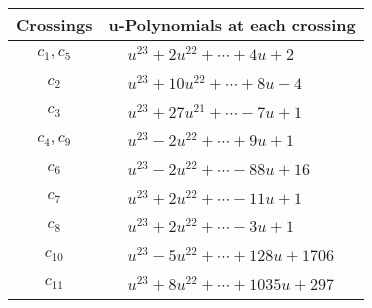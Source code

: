 \documentclass[1p]{elsarticle_modified}
\theoremstyle{definition}
\begin{document}
\begin{tabular}{m{50pt}|m{274pt}}
Crossings & \hspace{64pt}u-Polynomials at each crossing \\
\hline $$\begin{aligned}c_{1},c_{5}\end{aligned}$$&$\begin{aligned}
&u^{23}+2 u^{22}+\cdots+4 u+2
\end{aligned}$\\
\hline $$\begin{aligned}c_{2}\end{aligned}$$&$\begin{aligned}
&u^{23}+10 u^{22}+\cdots+8 u-4
\end{aligned}$\\
\hline $$\begin{aligned}c_{3}\end{aligned}$$&$\begin{aligned}
&u^{23}+27 u^{21}+\cdots-7 u+1
\end{aligned}$\\
\hline $$\begin{aligned}c_{4},c_{9}\end{aligned}$$&$\begin{aligned}
&u^{23}-2 u^{22}+\cdots+9 u+1
\end{aligned}$\\
\hline $$\begin{aligned}c_{6}\end{aligned}$$&$\begin{aligned}
&u^{23}-2 u^{22}+\cdots-88 u+16
\end{aligned}$\\
\hline $$\begin{aligned}c_{7}\end{aligned}$$&$\begin{aligned}
&u^{23}+2 u^{22}+\cdots-11 u+1
\end{aligned}$\\
\hline $$\begin{aligned}c_{8}\end{aligned}$$&$\begin{aligned}
&u^{23}+2 u^{22}+\cdots-3 u+1
\end{aligned}$\\
\hline $$\begin{aligned}c_{10}\end{aligned}$$&$\begin{aligned}
&u^{23}-5 u^{22}+\cdots+128 u+1706
\end{aligned}$\\
\hline $$\begin{aligned}c_{11}\end{aligned}$$&$\begin{aligned}
&u^{23}+8 u^{22}+\cdots+1035 u+297
\end{aligned}$\\
\hline
\end{tabular}\\~\\
\end{document}
